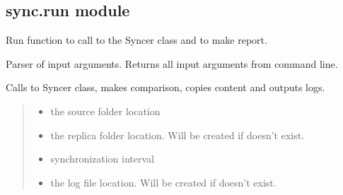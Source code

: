 \documentclass[letterpaper,10pt,english]{sphinxmanual}
\begin{document}
\subsection{sync.run module}
\label{\detokenize{sync:module-sync.run}}\label{\detokenize{sync:sync-run-module}}
\sphinxAtStartPar
Run function to call to the Syncer class and to make report.

\begin{fulllineitems}
\label{\detokenize{sync:sync.run.args_parser}}
\pysigstartsignatures
{}
\pysigstopsignatures
\sphinxAtStartPar
Parser of input arguments. Returns all input arguments from command line.

\end{fulllineitems}


\begin{fulllineitems}
\label{\detokenize{sync:sync.run.synchronize}}
\pysigstartsignatures
{}
\pysigstopsignatures
\sphinxAtStartPar
Calls to Syncer class, makes comparison, copies content and outputs logs.
\begin{quote}\begin{description}
\begin{itemize}
\item {} 
\sphinxAtStartPar
{} \textendash{} the source folder location

\item {} 
\sphinxAtStartPar
{} \textendash{} the replica folder location. Will be created if doesn’t exist.

\item {} 
\sphinxAtStartPar
{} \textendash{} synchronization interval

\item {} 
\sphinxAtStartPar
{} \textendash{} the log file location. Will be created if doesn’t exist.

\end{itemize}

\end{description}\end{quote}

\end{fulllineitems}
\end{document}
